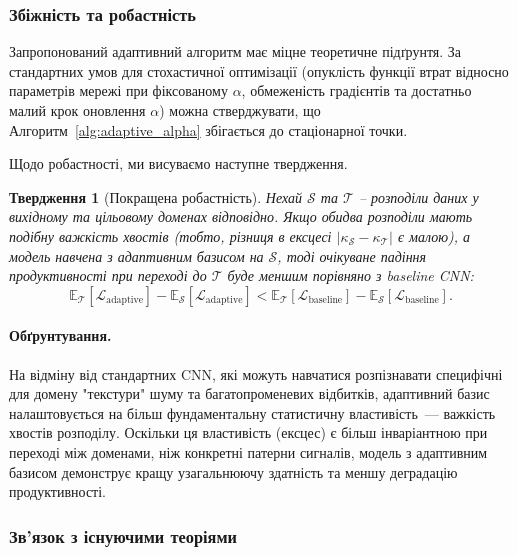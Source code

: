 \documentclass[12pt,a4paper]{article}
\newtheorem{proposition}{Твердження}
\begin{document}
\subsubsection{Збіжність та робастність}

Запропонований адаптивний алгоритм має міцне теоретичне підґрунтя. За стандартних умов для стохастичної оптимізації (опуклість функції втрат відносно параметрів мережі при фіксованому $\alpha$, обмеженість градієнтів та достатньо малий крок оновлення $\alpha$) можна стверджувати, що Алгоритм~\ref{alg:adaptive_alpha} збігається до стаціонарної точки.

Щодо робастності, ми висуваємо наступне твердження.
\begin{proposition}[Покращена робастність]
	\label{prop:robustness}
	Нехай $\mathcal{S}$ та $\mathcal{T}$ -- розподіли даних у вихідному та цільовому доменах відповідно. Якщо обидва розподіли мають подібну важкість хвостів (тобто, різниця в ексцесі $|\kappa_\mathcal{S} - \kappa_\mathcal{T}|$ є малою), а модель навчена з адаптивним базисом на $\mathcal{S}$, тоді очікуване падіння продуктивності при переході до $\mathcal{T}$ буде меншим порівняно з baseline CNN:
	\begin{equation}
		\mathbb{E}_\mathcal{T}[\mathcal{L}_{\text{adaptive}}] - \mathbb{E}_\mathcal{S}[\mathcal{L}_{\text{adaptive}}] < \mathbb{E}_\mathcal{T}[\mathcal{L}_{\text{baseline}}] - \mathbb{E}_\mathcal{S}[\mathcal{L}_{\text{baseline}}].
	\end{equation}
\end{proposition}

\paragraph{Обґрунтування.} На відміну від стандартних CNN, які можуть навчатися розпізнавати специфічні для домену "текстури" шуму та багатопроменевих відбитків, адаптивний базис налаштовується на більш фундаментальну статистичну властивість~--- важкість хвостів розподілу. Оскільки ця властивість (ексцес) є більш інваріантною при переході між доменами, ніж конкретні патерни сигналів, модель з адаптивним базисом демонструє кращу узагальнюючу здатність та меншу деградацію продуктивності.

\subsubsection{Зв'язок з існуючими теоріями}
\end{document}
